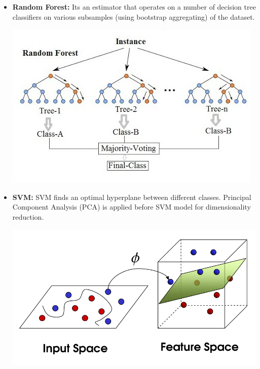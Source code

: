 \documentclass[a0,landscape]{a0poster}
\begin{document}
\begin{multicols}{4}
\begin{itemize}
\item \textbf{Random Forest:} Its an estimator that operates on a number of decision tree classifiers on various subsamples (using bootstrap aggregating) of the dataset.
\begin{center}\vspace{1cm}
\includegraphics[width=0.99\linewidth]{rf}
\end{center}\vspace{1cm}

\item \textbf{SVM:} SVM finds an optimal hyperplane between different classes. Principal Component Analysis (PCA) is applied before SVM model for dimensionality reduction.

\begin{center}\vspace{1cm}
\includegraphics[width=0.99\linewidth]{svm}
\end{center}\vspace{1cm}


\end{itemize}
\end{multicols}
\end{document}
